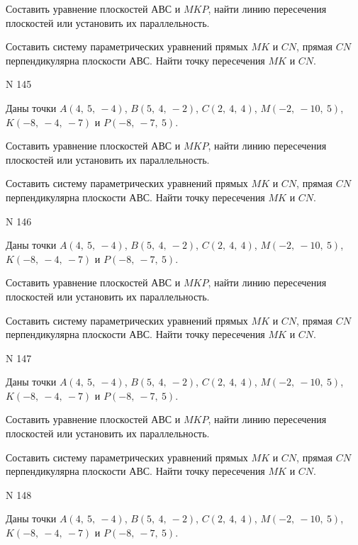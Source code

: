 \documentclass[11pt]{report}
\begin{document}
Составить уравнение плоскостей $АВС$ и $MKP$,
найти линию пересечения плоскостей или установить их параллельность.

Составить систему параметрических уравнений прямых $MK$ и $CN$,
прямая $CN$ перпендикулярна плоскости $АВС$. 
Найти точку пересечения $MK$ и $CN$.



 N 145

Даны точки $A\left( 4, \  5, \  -4\right)$, $B\left( 5, \  4, \  -2\right)$, $C\left( 2, \  4, \  4\right)$, $M\left( -2, \  -10, \  5\right)$, $K\left( -8, \  -4, \  -7\right)$ и $P\left( -8, \  -7, \  5\right)$.


Составить уравнение плоскостей $АВС$ и $MKP$,
найти линию пересечения плоскостей или установить их параллельность.

Составить систему параметрических уравнений прямых $MK$ и $CN$,
прямая $CN$ перпендикулярна плоскости $АВС$. 
Найти точку пересечения $MK$ и $CN$.



 N 146

Даны точки $A\left( 4, \  5, \  -4\right)$, $B\left( 5, \  4, \  -2\right)$, $C\left( 2, \  4, \  4\right)$, $M\left( -2, \  -10, \  5\right)$, $K\left( -8, \  -4, \  -7\right)$ и $P\left( -8, \  -7, \  5\right)$.


Составить уравнение плоскостей $АВС$ и $MKP$,
найти линию пересечения плоскостей или установить их параллельность.

Составить систему параметрических уравнений прямых $MK$ и $CN$,
прямая $CN$ перпендикулярна плоскости $АВС$. 
Найти точку пересечения $MK$ и $CN$.



 N 147

Даны точки $A\left( 4, \  5, \  -4\right)$, $B\left( 5, \  4, \  -2\right)$, $C\left( 2, \  4, \  4\right)$, $M\left( -2, \  -10, \  5\right)$, $K\left( -8, \  -4, \  -7\right)$ и $P\left( -8, \  -7, \  5\right)$.


Составить уравнение плоскостей $АВС$ и $MKP$,
найти линию пересечения плоскостей или установить их параллельность.

Составить систему параметрических уравнений прямых $MK$ и $CN$,
прямая $CN$ перпендикулярна плоскости $АВС$. 
Найти точку пересечения $MK$ и $CN$.



 N 148

Даны точки $A\left( 4, \  5, \  -4\right)$, $B\left( 5, \  4, \  -2\right)$, $C\left( 2, \  4, \  4\right)$, $M\left( -2, \  -10, \  5\right)$, $K\left( -8, \  -4, \  -7\right)$ и $P\left( -8, \  -7, \  5\right)$.
\end{document}
